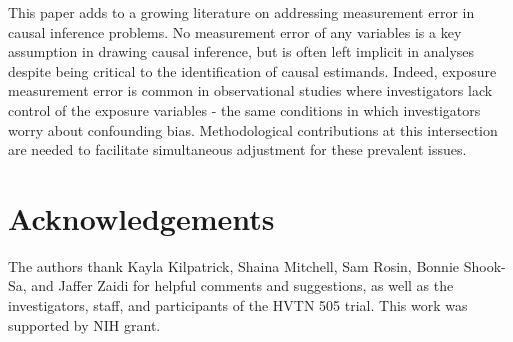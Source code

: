 \documentclass[useAMS,usenatbib,referee]{biom}
\begin{document}
This paper adds to a growing literature on addressing measurement error in causal inference problems. No measurement error of any variables is a key assumption in drawing causal inference, but is often left implicit in analyses despite being critical to the identification of causal estimands. Indeed, exposure measurement error is common in observational studies where investigators lack control of the exposure variables - the same conditions in which investigators worry about confounding bias. Methodological contributions at this intersection are needed to facilitate simultaneous adjustment for these prevalent issues.





\backmatter


\section*{Acknowledgements}

The authors thank Kayla Kilpatrick, Shaina Mitchell, Sam Rosin, Bonnie Shook-Sa, and Jaffer Zaidi for helpful comments and suggestions, as well as the investigators, staff, and participants of the HVTN 505 trial. This work was supported by NIH grant. \vspace*{-8pt}


\end{document}
